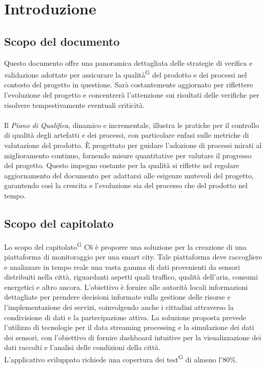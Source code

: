 \documentclass[8pt]{article}
\newcommand{\glossterm}[1]{#1\textsuperscript{G}} %
\begin{document}
\section{Introduzione}
\subsection{Scopo del documento}
Questo documento offre una panoramica dettagliata delle strategie di verifica e validazione adottate per assicurare la \glossterm{qualità} del prodotto e dei processi nel contesto del progetto in questione. Sarà costantemente aggiornato per riflettere l'evoluzione del progetto e concentrerà l'attenzione sui risultati delle verifiche per risolvere tempestivamente eventuali criticità.
\\\\
Il \textit{Piano di Qualifica}, dinamico e incrementale, illustra le pratiche per il controllo di qualità degli artefatti e dei processi, con particolare enfasi sulle metriche di valutazione del prodotto. È progettato per guidare l'adozione di processi mirati al miglioramento continuo, fornendo misure quantitative per valutare il progresso del progetto. Questo impegno costante per la qualità si riflette nel regolare aggiornamento del documento per adattarsi alle esigenze mutevoli del progetto, garantendo così la crescita e l'evoluzione sia del processo che del prodotto nel tempo.
\subsection{Scopo del capitolato}
Lo scopo del \glossterm{capitolato} C6 è proporre una soluzione per la creazione di una piattaforma di monitoraggio per una smart city. Tale piattaforma deve raccogliere e analizzare in tempo reale una vasta gamma di dati provenienti da sensori distribuiti nella città, riguardanti aspetti quali traffico, qualità dell'aria, consumi energetici e altro ancora. L'obiettivo è fornire alle autorità locali informazioni dettagliate per prendere decisioni informate sulla gestione delle risorse e l'implementazione dei servizi, coinvolgendo anche i cittadini attraverso la condivisione di dati e la partecipazione attiva. La soluzione proposta prevede l'utilizzo di tecnologie per il data streaming processing e la simulazione dei dati dei sensori, con l'obiettivo di fornire dashboard intuitive per la visualizzazione dei dati raccolti e l'analisi delle condizioni della città.\\
L’applicativo sviluppato richiede una copertura dei \glossterm{test} di almeno l’80\%.
\end{document}
